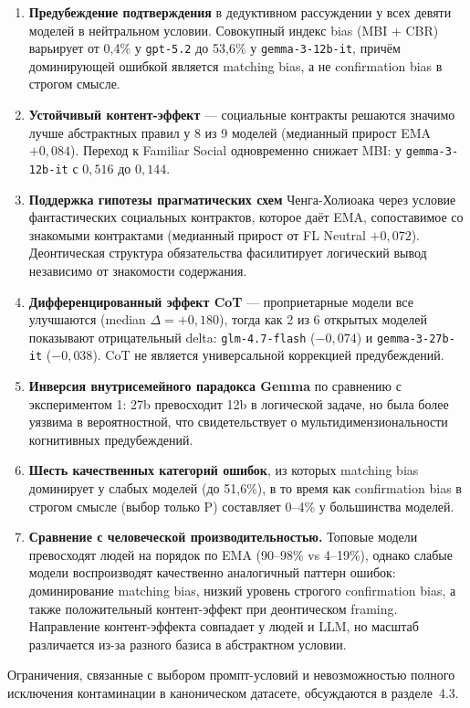 \begin{enumerate}
  \item \textbf{Предубеждение подтверждения} в дедуктивном рассуждении у всех девяти моделей в нейтральном условии. Совокупный индекс bias (MBI + CBR) варьирует от 0,4\% у \texttt{gpt-5.2} до 53,6\% у \texttt{gemma-3-12b-it}, причём доминирующей ошибкой является matching bias, а не confirmation bias в строгом смысле.

  \item \textbf{Устойчивый контент-эффект} --- социальные контракты решаются значимо лучше абстрактных правил у 8 из 9 моделей (медианный прирост EMA $+0{,}084$). Переход к Familiar Social одновременно снижает MBI: у \texttt{gemma-3-12b-it} с $0{,}516$ до $0{,}144$.

  \item \textbf{Поддержка гипотезы прагматических схем} Ченга-Холиоака через условие фантастических социальных контрактов, которое даёт EMA, сопоставимое со знакомыми контрактами (медианный прирост от FL Neutral $+0{,}072$). Деонтическая структура обязательства фасилитирует логический вывод независимо от знакомости содержания.

  \item \textbf{Дифференцированный эффект CoT} --- проприетарные модели все улучшаются (median $\Delta = +0{,}180$), тогда как 2 из 6 открытых моделей показывают отрицательный delta: \texttt{glm-4.7-flash} ($-0{,}074$) и \texttt{gemma-3-27b-it} ($-0{,}038$). CoT не является универсальной коррекцией предубеждений.

  \item \textbf{Инверсия внутрисемейного парадокса Gemma} по сравнению с экспериментом 1: 27b превосходит 12b в логической задаче, но была более уязвима в вероятностной, что свидетельствует о мультидимензиональности когнитивных предубеждений.

  \item \textbf{Шесть качественных категорий ошибок}, из которых matching bias доминирует у слабых моделей (до 51,6\%), в то время как confirmation bias в строгом смысле (выбор только P) составляет 0--4\% у большинства моделей.

  \item \textbf{Сравнение с человеческой производительностью.} Топовые модели превосходят людей на порядок по EMA (90--98\% vs 4--19\%), однако слабые модели воспроизводят качественно аналогичный паттерн ошибок: доминирование matching bias, низкий уровень строгого confirmation bias, а также положительный контент-эффект при деонтическом framing. Направление контент-эффекта совпадает у людей и LLM, но масштаб различается из-за разного базиса в абстрактном условии.
\end{enumerate}

Ограничения, связанные с выбором промпт-условий и невозможностью полного исключения контаминации в каноническом датасете, обсуждаются в разделе~4.3.

